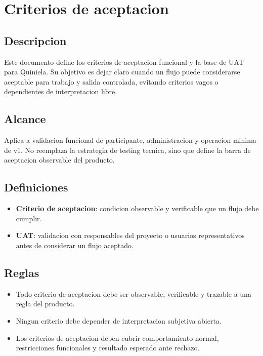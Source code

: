 \section{Criterios de aceptacion}

\subsection{Descripcion}

Este documento define los criterios de aceptacion funcional y la base de UAT para Quiniela. Su objetivo es dejar claro cuando un flujo puede considerarse aceptable para trabajo y salida controlada, evitando criterios vagos o dependientes de interpretacion libre.

\subsection{Alcance}

Aplica a validacion funcional de participante, administracion y operacion minima de v1. No reemplaza la estrategia de testing tecnica, sino que define la barra de aceptacion observable del producto.

\subsection{Definiciones}

\begin{itemize}
  \item \textbf{Criterio de aceptacion}: condicion observable y verificable que un flujo debe cumplir.
  \item \textbf{UAT}: validacion con responsables del proyecto o usuarios representativos antes de considerar un flujo aceptado.
\end{itemize}

\subsection{Reglas}

\begin{itemize}
  \item Todo criterio de aceptacion debe ser observable, verificable y trazable a una regla del producto.
  \item Ningun criterio debe depender de interpretacion subjetiva abierta.
  \item Los criterios de aceptacion deben cubrir comportamiento normal, restricciones funcionales y resultado esperado ante rechazo.
\end{itemize}

